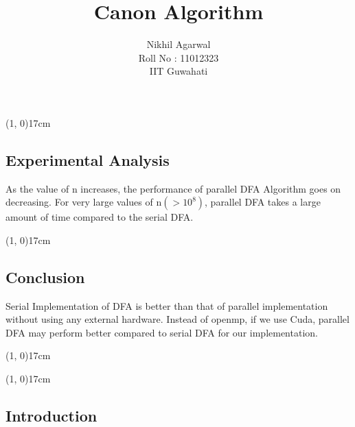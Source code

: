 \documentclass[10pt]{article}
\begin{document}
\begin{center}
	\line(1, 0){17cm}
\end{center}

\begin{center}
 \section*{Experimental Analysis}
\end{center}

As the value of n increases, the performance of parallel DFA Algorithm goes on decreasing. For very large values of n$(>10^8)$, parallel DFA takes a large amount of time compared to the serial DFA.

\begin{center}
	\line(1, 0){17cm}
\end{center}

\begin{center}
 \section*{Conclusion}
\end{center}
 
Serial Implementation of DFA is better than that of parallel implementation without using any external hardware. Instead of openmp, if we use Cuda, parallel DFA may perform better compared to serial DFA for our implementation. 

\begin{center}
	\line(1, 0){17cm}
\end{center}

\pagebreak

\begin{center}
\title{\textbf{\LARGE {Canon Algorithm\\}}}
\author{Nikhil Agarwal \\
		Roll No : 11012323 \\
		IIT Guwahati}
\end{center}

\begin{center}
	\line(1, 0){17cm}
\end{center}

\begin{center}
 \section*{Introduction}
 \end{center}
 
\end{document}
